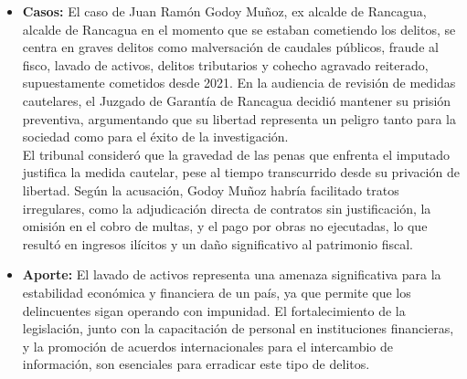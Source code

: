 \documentclass[letter,12pt]{article}
\begin{document}
\begin{itemize}
		\item \textbf{Casos: }El caso de Juan Ramón Godoy Muñoz, ex alcalde de Rancagua, alcalde de Rancagua en el momento que se estaban cometiendo los delitos, se centra en graves delitos como malversación de caudales públicos, fraude al fisco, lavado de activos, delitos tributarios y cohecho agravado reiterado, supuestamente cometidos desde 2021. En la audiencia de revisión de medidas cautelares, el Juzgado de Garantía de Rancagua decidió mantener su prisión preventiva, argumentando que su libertad representa un peligro tanto para la sociedad como para el éxito de la investigación.\\ El tribunal consideró que la gravedad de las penas que enfrenta el imputado justifica la medida cautelar, pese al tiempo transcurrido desde su privación de libertad. Según la acusación, Godoy Muñoz habría facilitado tratos irregulares, como la adjudicación directa de contratos sin justificación, la omisión en el cobro de multas, y el pago por obras no ejecutadas, lo que resultó en ingresos ilícitos y un daño significativo al patrimonio fiscal.\\
		
		\item \textbf{Aporte: }El lavado de activos representa una amenaza significativa para la estabilidad económica y financiera de un país, ya que permite que los delincuentes sigan operando con impunidad. El fortalecimiento de la legislación, junto con la capacitación de personal en instituciones financieras, y la promoción de acuerdos internacionales para el intercambio de información, son esenciales para erradicar este tipo de delitos.\\
	\end{itemize}
	
\end{document}
